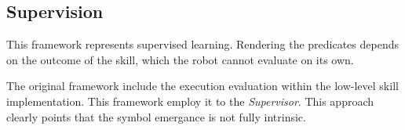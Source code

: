 \subsection{Supervision}
This framework represents supervised learning. Rendering the predicates depends on the outcome of the skill, which the robot cannot evaluate on its own. 

The original framework \parencite{konidaris2018skills} include the execution evaluation within the low-level skill implementation. This framework employ it to the \textit{Supervisor}. This approach clearly points that the symbol emergance is not fully intrinsic. %